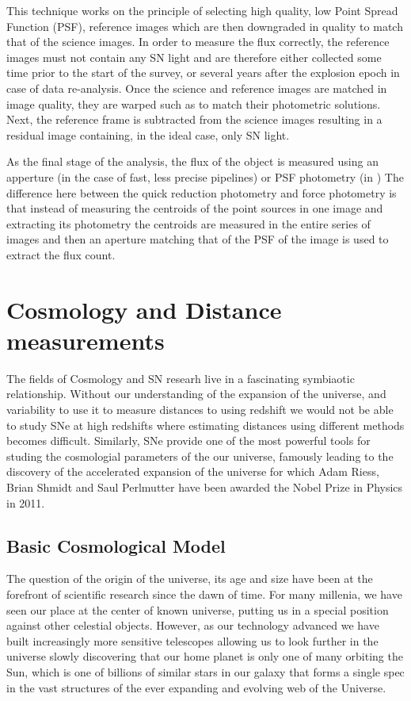 This technique works on the principle of selecting high quality, low Point Spread Function (PSF), reference images which are then downgraded in quality to match that of the science images. In order to measure the flux correctly, the reference images must not contain any SN light and are therefore either collected some time prior to the start of the survey, or several years after the explosion epoch in case of data re-analysis. Once the science and reference images are matched in image quality, they are warped such as to match their photometric solutions. Next, the reference frame is subtracted from the science images resulting in a residual image containing, in the ideal case, only SN light.

As the final stage of the analysis, the flux of the object is measured using an apperture (in the case of fast, less precise pipelines) or PSF photometry (in ) The difference here between the quick reduction photometry and force photometry is that instead of measuring the centroids of the point sources in one image and extracting its photometry the centroids are measured in the entire series of images and then an aperture matching that of the PSF of the image is used to extract the flux count.

\section{Cosmology and Distance measurements}
The fields of Cosmology and SN researh live in a fascinating symbiaotic relationship. Without our understanding of the expansion of the universe, and variability to use it to measure distances to using redshift we would not be able to study SNe at high redshifts where estimating distances using different methods becomes difficult. Similarly, SNe provide one of the most powerful tools for studing the cosmologial parameters of the our universe, famously leading to the discovery of the accelerated expansion of the universe \citep{Riess1998,Perlmutter1997} for which Adam Riess, Brian Shmidt and Saul Perlmutter have been awarded the Nobel Prize in Physics in 2011.

\subsection{Basic Cosmological Model}
The question of the origin of the universe, its age and size have been at the forefront of scientific research since the dawn of time. For many millenia, we have seen our place at the center of known universe, putting us in a special position against other celestial objects. However, as our technology advanced we have built increasingly more sensitive telescopes allowing us to look further in the universe slowly discovering that our home planet is only one of many orbiting the Sun, which is one of billions of similar stars in our galaxy that forms a single spec in the vast structures of the ever expanding and evolving web of the Universe.

